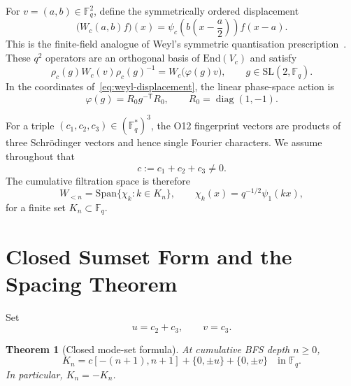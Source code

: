 \documentclass[11pt,a4paper]{article}
\newtheorem{theorem}{Theorem}[section]
\theoremstyle{definition}
\theoremstyle{remark}
\newcommand{\Fq}{\mathbb{F}_q}
\newcommand{\G}{\mathrm{SL}(2,\Fq)}
\newcommand{\End}{\mathrm{End}}
\newcommand{\Span}{\mathrm{Span}}
\begin{document}
For $v=(a,b)\in\Fq^2$, define the symmetrically ordered displacement
\begin{equation}
  \bigl(W_c(a,b)f\bigr)(x)
  =\psi_c\!\left(b\left(x-\frac{a}{2}\right)\right)f(x-a).
  \label{eq:weyl-displacement}
\end{equation}
This is the finite-field analogue of Weyl's symmetric quantisation
prescription~\cite{Weyl1927}.
These $q^2$ operators are an orthogonal basis of $\End(V_c)$ and satisfy
\begin{equation}
  \rho_c(g)W_c(v)\rho_c(g)^{-1}=W_c\bigl(\varphi(g)v\bigr),
  \qquad g\in\G.
  \label{eq:weyl-covariance}
\end{equation}
In the coordinates of~\eqref{eq:weyl-displacement}, the linear phase-space action is
\begin{equation}
  \varphi(g)=R_0g^{-\mathsf{T}}R_0,
  \qquad R_0=\operatorname{diag}(1,-1).
  \label{eq:phase-space-action}
\end{equation}

For a triple $(c_1,c_2,c_3)\in(\Fq^*)^3$, the O12 fingerprint vectors are products of
three Schr\"odinger vectors and hence single Fourier characters.
We assume throughout that
\begin{equation}
  c:=c_1+c_2+c_3\ne0.
  \label{eq:total-character}
\end{equation}
The cumulative filtration space is therefore
\begin{equation}
  W_{<n}=\Span\{\chi_k:k\in K_n\},
  \qquad \chi_k(x)=q^{-1/2}\psi_1(kx),
  \label{eq:fourier-filtration}
\end{equation}
for a finite set $K_n\subset\Fq$.

\section{Closed Sumset Form and the Spacing Theorem}
\label{sec:sumset}

Set
\begin{equation}
  u=c_2+c_3,
  \qquad v=c_3.
  \label{eq:u-v}
\end{equation}

\begin{theorem}[Closed mode-set formula]
  \label{thm:closed-mode-set}
  At cumulative BFS depth $n\geq0$,
  \begin{equation}
    K_n=c[-(n+1),n+1]+\{0,\pm u\}+\{0,\pm v\}
    \quad\text{in }\Fq.
    \label{eq:closed-mode-set}
  \end{equation}
  In particular, $K_n=-K_n$.
\end{theorem}
\end{document}
